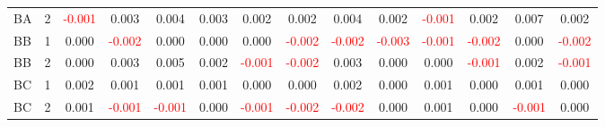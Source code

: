 \begin{table}[H]
{\begin{tabular}{llcccccccccccc}
BA & 2 & \textcolor{red}{-0.001} & 0.003 & 0.004 & 0.003 & 0.002 & 0.002 & 0.004 & 0.002 & \textcolor{red}{-0.001} & 0.002 & 0.007 & 0.002\\
BB & 1 & 0.000 & \textcolor{red}{-0.002} & 0.000 & 0.000 & 0.000 & \textcolor{red}{-0.002} & \textcolor{red}{-0.002} & \textcolor{red}{-0.003} & \textcolor{red}{-0.001} & \textcolor{red}{-0.002} & 0.000 & \textcolor{red}{-0.002}\\
BB & 2 & 0.000 & 0.003 & 0.005 & 0.002 & \textcolor{red}{-0.001} & \textcolor{red}{-0.002} & 0.003 & 0.000 & 0.000 & \textcolor{red}{-0.001} & 0.002 & \textcolor{red}{-0.001}\\
BC & 1 & 0.002 & 0.001 & 0.001 & 0.001 & 0.000 & 0.000 & 0.002 & 0.000 & 0.001 & 0.000 & 0.001 & 0.000\\
BC & 2 & 0.001 & \textcolor{red}{-0.001} & \textcolor{red}{-0.001} & 0.000 & \textcolor{red}{-0.001} & \textcolor{red}{-0.002} & \textcolor{red}{-0.002} & 0.000 & 0.001 & 0.000 & \textcolor{red}{-0.001} & 0.000\\
\hline
    \end{tabular}%
    }
    \label{tab:cen7_uni}
\end{table}

